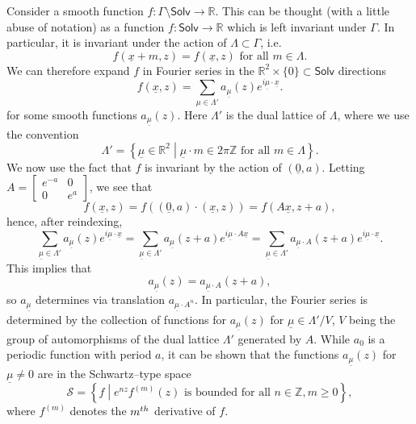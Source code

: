 \documentclass[11pt]{article}
\theoremstyle{definition}
\numberwithin{equation}{section}
\numberwithin{figure}{section}
\numberwithin{table}{section}
\newcommand{\Solv}{\mathsf{Solv}}
\begin{document}
Consider a smooth function $f:\Gamma\setminus\Solv\rightarrow\mathbb{R}$. This can be thought (with a little abuse of notation) as a function $f:\Solv\rightarrow \mathbb{R}$ which is left invariant under $\Gamma$. In particular, it is invariant under the action of $\Lambda\subset\Gamma$, i.e.
\[
f(\underline{x}+m,z)=f(\underline{x},z)\text{ for all }m\in \Lambda.
\]
We can therefore expand $f$ in Fourier series in the $\mathbb{R}^2\times\{0\}\subset\Solv$ directions
\[
f(\underline{x},z)=\sum_{\mu\in \Lambda'} a_{\underline{\mu}}(z)e^{ i \underline{\mu}\cdot \underline{x}}.
\]
for some smooth functions $a_{\underline{\mu}}(z)$. Here $\Lambda'$ is the dual lattice of $\Lambda$, where we use the convention
\[
\Lambda'=\left\{\underline{\mu}\in \mathbb{R}^2\middle| \underline{\mu}\cdot m\in 2\pi\mathbb{Z}\text{ for all }m\in\Lambda\right\}.
\]
We now use the fact that $f$ is invariant by the action of $(\underline{0},a)$. Letting $A=
\begin{bmatrix}e^{-a}&0\\0 &e^{a}
\end{bmatrix}$, we see that
\[
f(\underline{x},z)=f((\underline{0},a)\cdot(\underline{x},z))=f(A\underline{x}, z+a),
\]
hence, after reindexing,
\[
\sum_{\underline{\mu}\in \Lambda'} a_{\underline{\mu}}(z)e^{ i \underline{\mu}\cdot \underline{x}}=\sum_{\underline{\mu}\in \Lambda'} a_{\underline{\mu}}(z+a)e^{ i \underline{\mu}\cdot A\underline{x}}=\sum_{\underline{\mu}\in \Lambda'} a_{\underline{\mu}\cdot A}(z+a)e^{ i \underline{\mu}\cdot\underline{x}}.
\]
This implies that
\[
a_{\underline{\mu}}(z)=a_{\underline{\mu}\cdot A}(z+a),
\]
so $a_{\underline{\mu}}$ determines via translation $a_{\underline{\mu}\cdot A^n}$. In particular, the Fourier series is determined by the collection of functions for $a_{\underline{\mu}}(z)$ for $\underline{\mu}\in \Lambda'/V$, $V$ being the group of automorphisms of the dual lattice $\Lambda'$ generated by $A$. While $a_0$ is a periodic function with period $a$, it can be shown that the functions $a_{\underline{\mu}}(z)$ for $\underline{\mu}\neq 0$ are in the Schwartz--type space
\begin{equation}\label{schwartz}
\mathcal{S}=\left\{f\middle| e^{nz}f^{(m)}(z) \text{ is bounded for all }n\in\mathbb{Z},m\geq0\right\},
\end{equation}
where $f^{(m)}$ denotes the $m^{\rm th}$ derivative of $f$.
\end{document}
